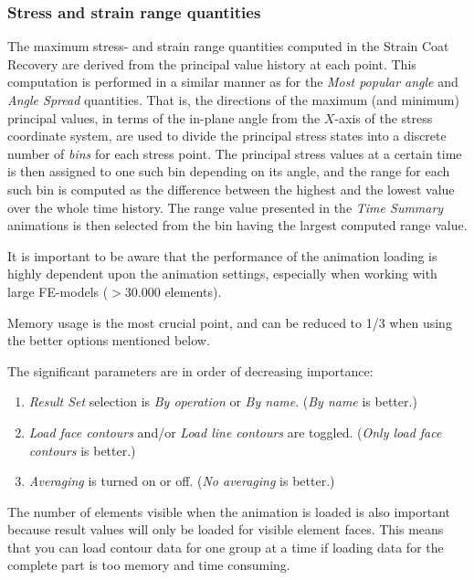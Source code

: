 \subsubsection{Stress and strain range quantities}

The maximum stress- and strain range quantities computed in the Strain Coat
Recovery are derived from the principal value history at each point.
This computation is performed in a similar manner as for the
{\sl Most popular angle} and {\sl Angle Spread} quantities.
That is, the directions of the maximum (and minimum) principal values,
in terms of the in-plane angle from the $X$-axis of the stress coordinate
system, are used to divide the principal stress states into a discrete number
of {\sl bins} for each stress point. The principal stress values at a certain
time is then assigned to one such bin depending on its angle, and the range for
each such bin is computed as the difference between the highest and the lowest
value over the whole time history. The range value presented in the
{\sl Time Summary} animations is then selected from the bin having the largest
computed range value.



It is important to be aware that the performance of the animation
loading is highly dependent upon the animation settings, especially when
working with large FE-models ($>30.000$ elements).

Memory usage is the most crucial point, and can be reduced to 1/3 when
using the better options mentioned below.

The significant parameters are in order of decreasing importance:

\begin{enumerate}
\item
  {\sl Result Set} selection is {\sl By operation} or {\sl By name}.
  ({\sl By name} is better.)
\item
  {\sl Load face contours} and/or {\sl Load line contours} are toggled.
  ({\sl Only load face contours} is better.)
\item
  {\sl Averaging} is turned on or off.
  ({\sl No averaging} is better.)
\end{enumerate}

The number of elements visible when the animation is loaded is also
important because result values will only be loaded for visible element
faces. This means that you can load contour data for one group at a time
if loading data for the complete part is too memory and time consuming.


